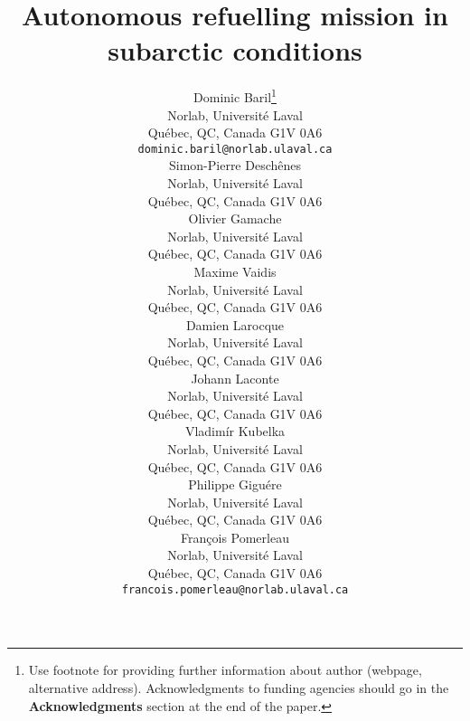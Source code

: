 \documentclass{article}
\title{Autonomous refuelling mission in subarctic conditions}
\author{
Dominic Baril\thanks{ Use footnote for providing further information
	about author (webpage, alternative address). Acknowledgments to
	funding agencies should go in the \textbf{Acknowledgments} section
	at the end of the paper.} \\
Norlab, Universit\'{e} Laval\\
Qu\'{e}bec, QC, Canada G1V 0A6 \\
\texttt{dominic.baril@norlab.ulaval.ca} \\
\And
Simon-Pierre Desch\^{e}nes \\
Norlab, Universit\'{e} Laval\\
Qu\'{e}bec, QC, Canada G1V 0A6 \\
\And
Olivier Gamache \\
Norlab, Universit\'{e} Laval\\
Qu\'{e}bec, QC, Canada G1V 0A6 \\
\And
Maxime Vaidis \\
Norlab, Universit\'{e} Laval\\
Qu\'{e}bec, QC, Canada G1V 0A6 \\
\And
Damien Larocque \\
Norlab, Universit\'{e} Laval\\
Qu\'{e}bec, QC, Canada G1V 0A6 \\
\And
Johann Laconte \\
Norlab, Universit\'{e} Laval\\
Qu\'{e}bec, QC, Canada G1V 0A6 \\
\And
Vladim\'{i}r Kubelka \\
Norlab, Universit\'{e} Laval\\
Qu\'{e}bec, QC, Canada G1V 0A6 \\
\And
Philippe Gigu\'{e}re \\
Norlab, Universit\'{e} Laval\\
Qu\'{e}bec, QC, Canada G1V 0A6 \\
\And
Fran\c{c}ois Pomerleau \\
Norlab, Universit\'{e} Laval\\
Qu\'{e}bec, QC, Canada G1V 0A6 \\
\texttt{francois.pomerleau@norlab.ulaval.ca} \\
}
\begin{document}
\maketitle

\begin{abstract}
\lightlipsum[1]
\end{abstract}











%
%
\printbibliography
\end{document}
